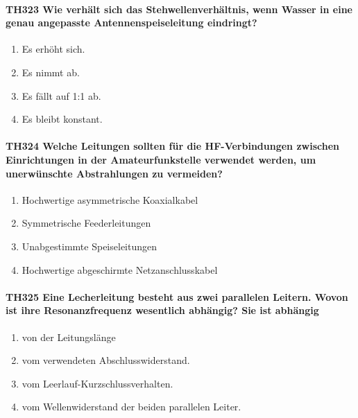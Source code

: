 \documentclass[8pt]{article}
\begin{document}
\paragraph*{TH323 Wie verhält sich das Stehwellenverhältnis, wenn Wasser in eine genau angepasste Antennenspeiseleitung eindringt?}
\begin{enumerate}[nolistsep,label=\Alph*]
\item Es erhöht sich.
\item Es nimmt ab.
\item Es fällt auf 1:1 ab.
\item Es bleibt konstant.
\end{enumerate}

\paragraph*{TH324 Welche Leitungen sollten für die HF-Verbindungen zwischen Einrichtungen in der Amateurfunkstelle verwendet werden, um unerwünschte Abstrahlungen zu vermeiden?}
\begin{enumerate}[nolistsep,label=\Alph*]
\item Hochwertige asymmetrische Koaxialkabel
\item Symmetrische Feederleitungen
\item Unabgestimmte Speiseleitungen
\item Hochwertige abgeschirmte Netzanschlusskabel
\end{enumerate}

\paragraph*{TH325 Eine Lecherleitung besteht aus zwei parallelen Leitern. Wovon ist ihre Resonanzfrequenz wesentlich abhängig? Sie ist abhängig} 
\begin{enumerate}[nolistsep,label=\Alph*]
\item von der Leitungslänge
\item vom verwendeten Abschlusswiderstand.
\item vom Leerlauf-Kurzschlussverhalten.
\item vom Wellenwiderstand der beiden parallelen Leiter.
\end{enumerate}
\end{document}
